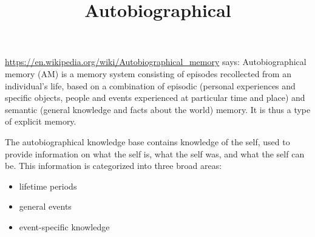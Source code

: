 \documentclass[a4paper]{article}
\title{Autobiographical}
\begin{document}
    \maketitle
    \url{https://en.wikipedia.org/wiki/Autobiographical_memory} says:
    Autobiographical memory (AM) is a memory system consisting of episodes recollected from an individual's life, based on a combination of episodic (personal experiences and specific objects, people and events experienced at particular time and place) and semantic (general knowledge and facts about the world) memory. It is thus a type of explicit memory.
    
    The autobiographical knowledge base contains knowledge of the self, used to provide information on what the self is, what the self was, and what the self can be. This information is categorized into three broad areas:
    \begin{itemize}
        \item lifetime periods
        \item general events
        \item event-specific knowledge
    \end{itemize}
    
\end{document}
